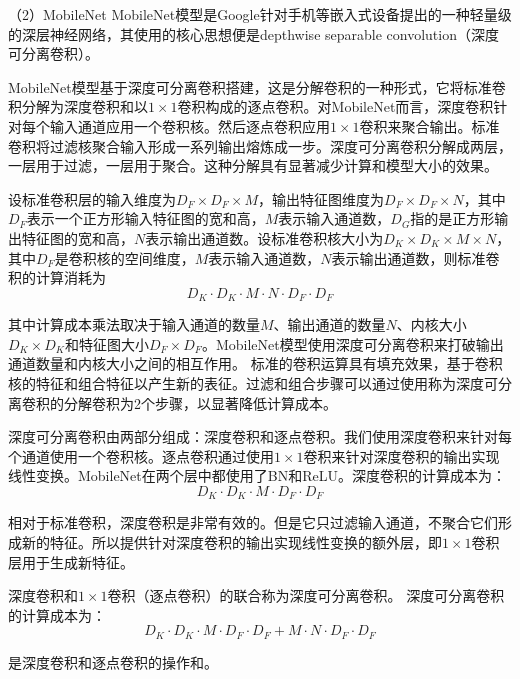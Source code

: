 （2）MobileNet
MobileNet\cite{howard2017mobilenets}模型是Google针对手机等嵌入式设备提出的一种轻量级的深层神经网络，其使用的核心思想便是depthwise separable convolution（深度可分离卷积）。

MobileNet模型基于深度可分离卷积搭建，这是分解卷积的一种形式，它将标准卷积分解为深度卷积和以$1\times1$卷积构成的逐点卷积。对MobileNet而言，深度卷积针对每个输入通道应用一个卷积核。然后逐点卷积应用$1\times1$卷积来聚合输出。标准卷积将过滤核聚合输入形成一系列输出熔炼成一步。深度可分离卷积分解成两层，一层用于过滤，一层用于聚合。这种分解具有显著减少计算和模型大小的效果。

设标准卷积层的输入维度为$D_{F} \times D_{F} \times M$，输出特征图维度为$D_{F} \times D_{F} \times N$，其中$D_{F}$表示一个正方形输入特征图的宽和高，$M$表示输入通道数，$D_{G}$指的是正方形输出特征图的宽和高，$N$表示输出通道数。设标准卷积核大小为$D_{K} \times D_{K} \times M \times N$，其中$D_{F}$是卷积核的空间维度，$M$表示输入通道数，$N$表示输出通道数，则标准卷积的计算消耗为
\begin{equation}
    D_{K} \cdot D_{K} \cdot M \cdot N \cdot D_{F} \cdot D_{F}
\end{equation}

其中计算成本乘法取决于输入通道的数量$M$、输出通道的数量$N$、内核大小$D_{K} \times D_{K}$和特征图大小$D_{F} \times D_{F}$。MobileNet模型使用深度可分离卷积来打破输出通道数量和内核大小之间的相互作用。
标准的卷积运算具有填充效果，基于卷积核的特征和组合特征以产生新的表征。过滤和组合步骤可以通过使用称为深度可分离卷积的分解卷积为2个步骤，以显著降低计算成本。

深度可分离卷积由两部分组成：深度卷积和逐点卷积。我们使用深度卷积来针对每个通道使用一个卷积核。逐点卷积通过使用$1\times1$卷积来针对深度卷积的输出实现线性变换。MobileNet在两个层中都使用了BN和ReLU。深度卷积的计算成本为：
\begin{equation}
    D_{K} \cdot D_{K} \cdot M \cdot D_{F} \cdot D_{F}
\end{equation}

相对于标准卷积，深度卷积是非常有效的。但是它只过滤输入通道，不聚合它们形成新的特征。所以提供针对深度卷积的输出实现线性变换的额外层，即$1\times1$卷积层用于生成新特征。

深度卷积和$1\times1$卷积（逐点卷积）的联合称为深度可分离卷积。
深度可分离卷积的计算成本为：
\begin{equation}
    D_{K} \cdot D_{K} \cdot M \cdot D_{F} \cdot D_{F}+M \cdot N \cdot D_{F} \cdot D_{F}
\end{equation}

是深度卷积和逐点卷积的操作和。

